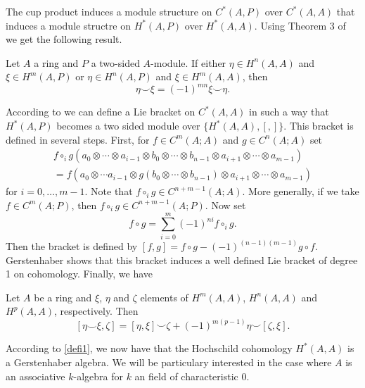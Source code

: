 \documentclass[TFM.tex]{subfiles}
\begin{document}
The cup product induces a module structure on $C^*(A,P)$ over $C^*(A,A)$ that induces a module structre on $H^*(A,P)$ over $H^*(A,A)$. Using Theorem 3 of \cite{Gerstenhaber} we get the following result.

\begin{thm}\cite[Corollary 2 of ]{Gerstenhaber}
Let $A$ a ring and $P$ a two-sided $A$-module. If either $\eta\in H^n(A,A)$ and $\xi\in H^m(A,P)$ or $\eta\in H^n(A,P)$ and $\xi\in H^m(A,A)$, then
\[
\eta\smile\xi=(-1)^{mn}\xi\smile \eta.
\]
\end{thm}

According to \cite[Theorem 4 of ]{Gerstenhaber} we can define a Lie bracket on $C^*(A,A)$ in such a way that $H^*(A,P)$ becomes a two sided module over $\{H^*(A,A),[,]\}$. This bracket is defined in several steps. First, for $f\in C^m(A;A)$ and $g\in C^n(A;A)$ set
\begin{gather*}
f\circ_i g(a_0\otimes\cdots\otimes a_{i-1}\otimes b_0\otimes\cdots\otimes b_{n-1}\otimes a_{i+1}\otimes\cdots \otimes a_{m-1})\\
=f(a_0\otimes \cdots a_{i-1}\otimes g(b_0\otimes\cdots\otimes b_{n-1})\otimes a_{i+1}\otimes\cdots\otimes a_{m-1})
\end{gather*}
for $i=0,\dots, m-1$. Note that $f\circ_i g\in C^{n+m-1}(A;A)$. More generally, if we take $f\in C^m(A;P)$, then $f\circ_ig\in C^{n+m-1}(A;P)$. Now set
\[
f\circ g=\sum_{i=0}^m (-1)^{ni}f\circ_i g.
\]
Then the bracket is defined by $[f,g]=f\circ g-(-1)^{(n-1)(m-1)}g\circ f$. Gerstenhaber shows that this bracket induces a well defined Lie bracket of degree 1 on cohomology. Finally, we have

\begin{thm}\cite[Corollary 2 of ]{Gerstenhaber}
Let $A$ be a ring and $\xi$, $\eta$ and $\zeta$ elements of $H^m(A,A)$, $H^n(A,A)$ and $H^p(A,A)$, respectively. Then
\[
[\eta\smile\xi, \zeta]=[\eta,\xi]\smile \zeta+(-1)^{m(p-1)}\eta\smile[\zeta,\xi].
\]
\end{thm}


According to \ref{defi1}, we now have that the Hochschild cohomology $H^*(A,A)$ is a Gerstenhaber algebra. We will be particulary interested in the case where $A$ is an associative $k$-algebra for $k$ an field of characteristic 0.
\end{document}
